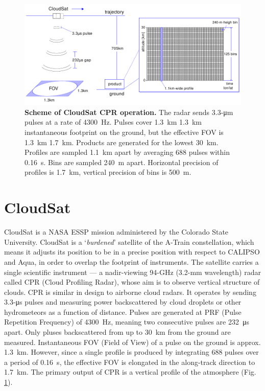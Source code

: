 \begin{figure}[t]
\includegraphics[width=\textwidth]{images/cloudsat-profile.pdf}
\caption[Scheme of CloudSat CPR operation]{\textbf{Scheme of CloudSat CPR operation.}
The radar sends 3.3-μm pulses at a rate of
\SI{4300}{Hz}. Pulses cover \SI{1.3}{km}\,\texttimes\,\SI{1.3}{km} instantaneous
footprint
on the ground, but the effective FOV is \SI{1.3}{km}\,\texttimes\,\SI{1.7}{km}.
Products
are generated for the lowest \SI{30}{km}. Profiles are sampled \SI{1.1}{km}
apart by averaging 688 pulses within \SI{0.16}{s}. Bins are sampled \SI{240}{m}
apart. Horizontal precision of profiles is \SI{1.7}{km}, vertical precision of
bins is \SI{500}{m}.}
\label{fig:cloudsat-profile}
\end{figure}

\section{CloudSat}\label{sec:atrain-cloudsat}
CloudSat is a NASA ESSP mission administered by the Colorado State University.
CloudSat is a `\textit{burdened}' satellite of the A-Train constellation, which means it
adjusts its position to be in a precise position with respect to CALIPSO and
Aqua, in order to overlap the footprint of instruments. The satellite carries a
single scientific instrument --- a nadir-viewing 94-GHz (3.2-mm wavelength) radar
called CPR (Cloud Profiling Radar), whose aim is to observe
vertical structure of clouds. CPR is similar in design to airborne cloud radars.
It operates by sending 3.3-μs pulses and measuring power backscattered by
cloud droplets or other hydrometeors as a function of distance. Pulses are
generated at PRF (Pulse Repetition Frequency) of \SI{4300}{Hz}, meaning two
consecutive pulses are \SI{232}{\micro s} apart. Only pluses backscattered from
up to
\SI{30}{km} from the ground are measured. Instantaneous FOV (Field of View) of a
pulse on the ground is approx. \SI{1.3}{km}. However, since a single profile is
produced by integrating 688 pulses over a period of \SI{0.16}{s}, the effective
FOV is elongated in the along-track direction to \SI{1.7}{km}. The primary
output of CPR is a vertical profile of the atmosphere
(Fig.\,\ref{fig:cloudsat-profile}).

